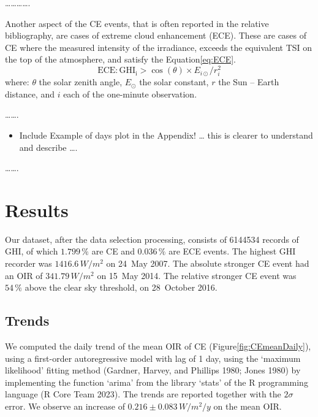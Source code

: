 \documentclass[
]{article}
\providecommand{\tightlist}{%
  \setlength{\itemsep}{0pt}\setlength{\parskip}{0pt}}
\begin{document}
\ldots\ldots\ldots\ldots.

Another aspect of the CE events, that is often reported in the relative bibliography,
are cases of extreme cloud enhancement (ECE). These are cases of CE where the
measured intensity of the irradiance, exceeds the equivalent TSI on the top of the
atmosphere, and satisfy the Equation\nobreakspace{}\ref{eq:ECE}.
\begin{equation}
\text{ECE}: \text{GHI}_\text{i} > \cos(\theta) \times E_{i\odot} / r_{i}^2
\label{eq:ECE}
\end{equation}
where: \(\theta\) the solar zenith angle, \(E_{\odot}\) the solar constant, \(r\) the Sun -- Earth distance, and \(i\) each of the one-minute observation.

\ldots\ldots.

\begin{itemize}
\tightlist
\item
  Include Example of days plot in the Appendix!
  \ldots{} this is clearer to understand and describe \ldots.
\end{itemize}

\ldots\ldots.

\FloatBarrier

\hypertarget{results}{%
\section{Results}\label{results}}

Our dataset, after the data selection processing, consists of
6144534 records of GHI, of which
\(1.799\,\%\) are CE and
\(0.036\,\%\) are ECE events.
The highest GHI recorder was
\(1416.6\,W/m^2\)
on 24~May 2007.
The absolute stronger CE event had an OIR of
\(341.79\,W/m^2\) on
15~May 2014.
The relative stronger CE event was
\(54\,\%\) above the
clear sky threshold, on
28~October 2016.

\hypertarget{trends}{%
\subsection{Trends}\label{trends}}

We computed the daily trend of the mean OIR of CE
(Figure\nobreakspace{}\ref{fig:CEmeanDaily}), using a first-order autoregressive
model with lag of 1 day, using the `maximum likelihood' fitting method (Gardner, Harvey, and Phillips 1980; Jones 1980) by implementing the function `arima' from the library `stats' of the R
programming language (R Core Team 2023). The trends are reported together with the \(2\sigma\)
error. We observe an increase of
\(0.216\pm 0.083\,W/m^2/y\)
on the mean OIR.
\end{document}
